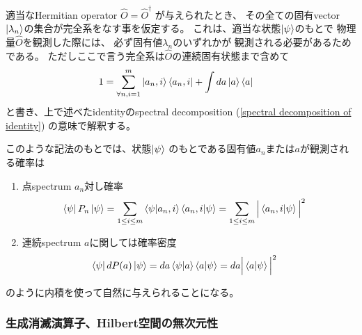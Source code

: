 適当なHermitian operator
$\hat{O} = \hat{O}^\dagger$
が与えられたとき、
その全ての固有vector
$\ket{\lambda_n}$の集合が完全系をなす事を仮定する。
これは、適当な状態$\ket{\psi}$のもとで
物理量$\hat{O}$を観測した際には、
必ず固有値$\lambda_n$のいずれかが
観測される必要があるためである。
ただしここで言う完全系は$\hat{O}$の連続固有状態まで含めて
\begin{align}
    1&=
    \sum_{\forall n,i=1}^m \ket{a_n,i}\bra{a_n,i}
    +
    \int da \ket{a}\bra{a}
\label{complete set of operator eigen vectors}
\end{align}
と書き、上で述べたidentityのspectral decomposition
(\ref{spectral decomposition of identity})
の意味で解釈する。

このような記法のもとでは、状態$\ket{\psi}$
のもとである固有値$a_n$または$a$が観測される確率は
\begin{enumerate}
    \item{点spectrum $a_n$対し確率
    \begin{align}
        \bra{\psi} P_n \ket{\psi}
        &=
            \sum_{1\le i \le m}
        \braket{\psi | a_n,i}
        \braket{a_n,i | \psi}
        =
            \sum_{1\le i \le m}
            \Big|
                \braket{a_n,i | \psi}
            \Big|^2
    \end{align}
    }
    \item{連続spectrum $a$に関しては確率密度
    \begin{align}
        \bra{\psi} d P(a) \ket{\psi}
        &=
        da \braket{\psi | a}\braket{a | \psi}
    =
        da
            \Big|
                \braket{a | \psi}
            \Big|^2
    \end{align}
    }
\end{enumerate}
のように内積を使って自然に与えられることになる。

\subsubsection{生成消滅演算子、Hilbert空間の無次元性}

